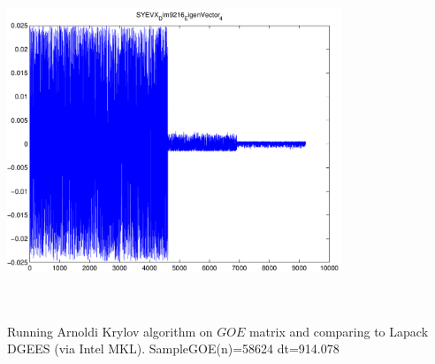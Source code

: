 \documentclass[9pt]{article}
\theoremstyle{plain}
\theoremstyle{definition}
\theoremstyle{remark}
\numberwithin{equation}{section}
\begin{document}
\includegraphics[width=10.0cm,height=10.0cm]{SYEVX_Dim9216_EigenVector_4.pdf}

Running Arnoldi Krylov algorithm on $GOE$ matrix and comparing to Lapack DGEES (via Intel MKL).
SampleGOE(n)=58624 dt=914.078
\end{document}
